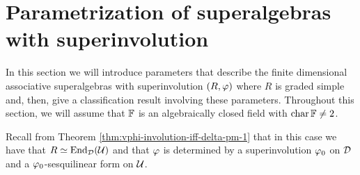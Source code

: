 







\section{Parametrization of superalgebras with superinvolution}

In this section we will introduce parameters that describe the finite dimensional associative superalgebras with superinvolution $(R, \varphi)$ where $R$ is graded simple and, then, give a classification result involving these parameters. 
Throughout this section, we will assume that $\mathbb{F}$ is an algebraically closed field with $\operatorname{char} \mathbb{F} \neq 2$.

Recall from Theorem \ref{thm:vphi-involution-iff-delta-pm-1} that in this case we have that $R \simeq \operatorname{End}_{\mathcal{D}} (\mathcal U)$ and that $\varphi$ is determined by a superinvolution $\varphi_0$ on $\mathcal{D}$ and a $\varphi_0$-sesquilinear form on $\mathcal U$.

